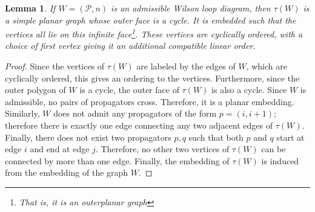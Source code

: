 \documentclass[11pt]{article}
\newcommand{\hlfix}[2]{\texthl{#1}\todo{#2}}
\newcommand{\cP}{\mathcal{P}}
\newtheorem{lem}[thm]{Lemma}
\theoremstyle{remark}
\theoremstyle{definition}
\begin{document}
\begin{lem}\label{tausimpleplanarlem}
If $W = (\cP, n)$ is an admissible Wilson loop diagram, then $\tau(W)$ is a simple planar graph whose outer face is a cycle. It is embedded such that the vertices all lie on this infinite face\footnote{That is, it is an \emph{outerplanar} graph}. These vertices are cyclically ordered, with a choice of first vertex giving it an additional compatible linear order.
\end{lem}

\begin{proof}
Since the vertices of $\tau(W)$ are labeled by the edges of $W$, which are cyclically ordered, this gives an ordering to the vertices. Furthermore, since the outer polygon of $W$ is a cycle, the outer face of $\tau(W)$ is also a cycle. Since $W$ is admissible, no pairs of propagators cross. Therefore, it is a planar embedding. Similarly, $W$ does not admit any propagators of the form $p = (i, i+1)$; therefore there is exactly one edge connecting any two adjacent edges of $\tau(W)$. Finally, there does not exist two propagators $p,q$ such that both $p$ and $q$ start at edge $i$ and end at edge $j$. Therefore, no other two vertices of $\tau(W)$ can be connected by more than one edge. Finally, the embedding of $\tau(W)$ is induced from the embedding of the graph $W$.
 \end{proof}

\end{document}
